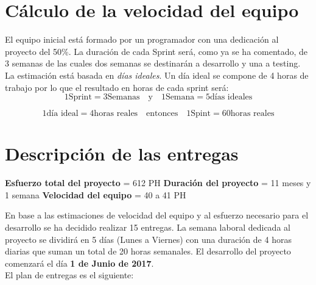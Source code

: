 \section{Cálculo de la velocidad del equipo}

El equipo inicial está formado por un programador con una dedicación al proyecto del 50\%. La duración de cada Sprint será, como ya se ha comentado, de 3 semanas de las cuales dos semanas se destinarán a desarrollo y una a testing.\\

La estimación está basada en \textit{días ideales}. Un día ideal se compone de 4 horas de trabajo por lo que el resultado en horas de cada  sprint será:\\

\[
1 \textrm{Sprint} = 3 \textrm{Semanas} \quad \textrm{y} \quad 1 \textrm{Semana} = 5 \textrm{días ideales}
\]

\[
1 \textrm{día ideal} = 4 \textrm{horas reales} \quad \textrm{entonces} \quad 1 \textrm{Spint} = 60 \textrm{horas reales}
\]

\section{Descripción de las entregas}

\textbf{Esfuerzo total del proyecto} = 612 PH
\textbf{Duración del proyecto} = 11 meses y 1 semana
\textbf{Velocidad del equipo} = 40 a 41 PH

En base a las estimaciones de velocidad del equipo y al esfuerzo necesario para el desarrollo se ha decidido realizar 15 entregas. La semana laboral dedicada al proyecto se dividirá en 5 días (Lunes a Viernes) con una duración de 4 horas diarias que suman un total de 20 horas semanales. El desarrollo del proyecto comenzará el día \textbf{1 de Junio de 2017}.\\


El plan de entregas es el siguiente:

